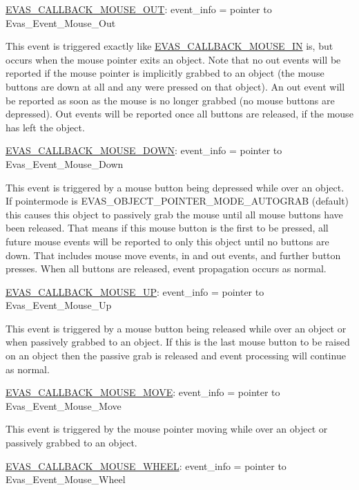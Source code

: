 \hyperlink{Evas_8h_a99e208e463a20499aabe6faac8a8cb8aa91aaa30a57047d0ee8a734e603751c25}{EVAS\_\-CALLBACK\_\-MOUSE\_\-OUT}: event\_\-info = pointer to Evas\_\-Event\_\-Mouse\_\-Out

This event is triggered exactly like \hyperlink{Evas_8h_a99e208e463a20499aabe6faac8a8cb8aa598c57bc146639618157159a319f11af}{EVAS\_\-CALLBACK\_\-MOUSE\_\-IN} is, but occurs when the mouse pointer exits an object. Note that no out events will be reported if the mouse pointer is implicitly grabbed to an object (the mouse buttons are down at all and any were pressed on that object). An out event will be reported as soon as the mouse is no longer grabbed (no mouse buttons are depressed). Out events will be reported once all buttons are released, if the mouse has left the object.

\hyperlink{Evas_8h_a99e208e463a20499aabe6faac8a8cb8aa9fa52651ccf7e47cd3b7785fc4cf393f}{EVAS\_\-CALLBACK\_\-MOUSE\_\-DOWN}: event\_\-info = pointer to Evas\_\-Event\_\-Mouse\_\-Down

This event is triggered by a mouse button being depressed while over an object. If pointermode is EVAS\_\-OBJECT\_\-POINTER\_\-MODE\_\-AUTOGRAB (default) this causes this object to passively grab the mouse until all mouse buttons have been released. That means if this mouse button is the first to be pressed, all future mouse events will be reported to only this object until no buttons are down. That includes mouse move events, in and out events, and further button presses. When all buttons are released, event propagation occurs as normal.

\hyperlink{Evas_8h_a99e208e463a20499aabe6faac8a8cb8aa8c1b22c99dd0231cd9ba1fecbffffac7}{EVAS\_\-CALLBACK\_\-MOUSE\_\-UP}: event\_\-info = pointer to Evas\_\-Event\_\-Mouse\_\-Up

This event is triggered by a mouse button being released while over an object or when passively grabbed to an object. If this is the last mouse button to be raised on an object then the passive grab is released and event processing will continue as normal.

\hyperlink{Evas_8h_a99e208e463a20499aabe6faac8a8cb8aa23fb97fb7cbccded54ccf3fc4e1dab8a}{EVAS\_\-CALLBACK\_\-MOUSE\_\-MOVE}: event\_\-info = pointer to Evas\_\-Event\_\-Mouse\_\-Move

This event is triggered by the mouse pointer moving while over an object or passively grabbed to an object.

\hyperlink{Evas_8h_a99e208e463a20499aabe6faac8a8cb8aa39d739f473db520ec4dfe0776ed43be4}{EVAS\_\-CALLBACK\_\-MOUSE\_\-WHEEL}: event\_\-info = pointer to Evas\_\-Event\_\-Mouse\_\-Wheel

